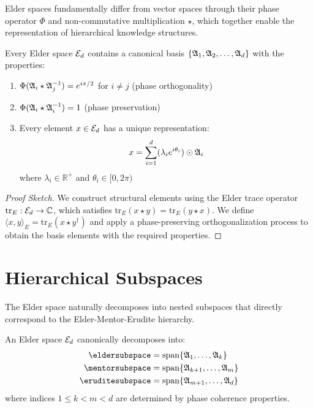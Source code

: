 Elder spaces fundamentally differ from vector spaces through their phase operator $\Phi$ and non-commutative multiplication $\star$, which together enable the representation of hierarchical knowledge structures.

\begin{theorem}
Every Elder space $\mathcal{E}_{d}$ contains a canonical basis $\{\mathfrak{A}_{1}, \mathfrak{A}_{2}, \ldots, \mathfrak{A}_{d}\}$ with the properties:
\begin{enumerate}
    \item $\Phi(\mathfrak{A}_{i} \star \mathfrak{A}_{j}^{-1}) = e^{i\pi/2}$ for $i \neq j$ (phase orthogonality)
    \item $\Phi(\mathfrak{A}_{i} \star \mathfrak{A}_{i}^{-1}) = 1$ (phase preservation)
    \item Every element $x \in \mathcal{E}_{d}$ has a unique representation:
    \begin{equation}
        x = \sum_{i=1}^{d} (\lambda_i e^{i\theta_i}) \odot \mathfrak{A}_{i}
    \end{equation}
    where $\lambda_i \in \mathbb{R}^+$ and $\theta_i \in [0, 2\pi)$
\end{enumerate}
\end{theorem}

\begin{proof}[Proof Sketch]
We construct structural elements using the Elder trace operator $\mathrm{tr}_E: \mathcal{E}_{d} \rightarrow \mathbb{C}$, which satisfies $\mathrm{tr}_E(x \star y) = \mathrm{tr}_E(y \star x)$. We define $\langle x, y \rangle_E = \mathrm{tr}_E(x \star y^{\dagger})$ and apply a phase-preserving orthogonalization process to obtain the basis elements with the required properties.
\end{proof}

\section{Hierarchical Subspaces}

The Elder space naturally decomposes into nested subspaces that directly correspond to the Elder-Mentor-Erudite hierarchy.

\begin{definition}
An Elder space $\mathcal{E}_{d}$ canonically decomposes into:
\begin{align}
    \eldersubspace &= \mathrm{span}\{\elderstructure{1}, \ldots, \elderstructure{k}\} \\
    \mentorsubspace &= \mathrm{span}\{\elderstructure{k+1}, \ldots, \elderstructure{m}\} \\
    \eruditesubspace &= \mathrm{span}\{\elderstructure{m+1}, \ldots, \elderstructure{d}\}
\end{align}
where indices $1 \leq k < m < d$ are determined by phase coherence properties.
\end{definition}

